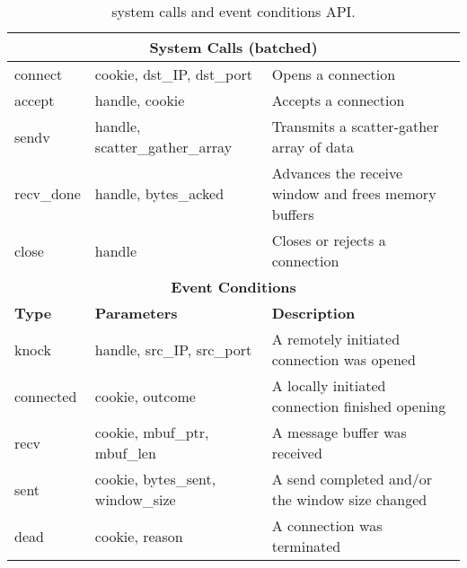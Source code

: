 \begin{table*}[t]
\centering
\begin{small}
\begin{tabular}{|l|l|l|}
\hline
\multicolumn{3}{|c|}{{\bf System Calls (batched)}} \\
\hline
connect &             cookie, dst\_IP, dst\_port		& Opens a connection\\
accept &              handle, cookie				& Accepts a connection\\
sendv &               handle, scatter\_gather\_array		& Transmits a scatter-gather array of data\\
recv\_done &          handle, bytes\_acked			& Advances the receive window and frees memory buffers\\
close &               handle					& Closes or rejects a connection\\
\hline  \hline
\multicolumn{3}{|c|}{{\bf Event Conditions}} \\
\hline
{\bf Type} &           {\bf Parameters}  &
{\bf Description}\\
knock  &               handle, src\_IP, src\_port		& A remotely initiated connection was opened \\
connected &            cookie, outcome				& A locally initiated connection finished opening \\
recv &                 cookie, mbuf\_ptr, mbuf\_len		& A message buffer was received \\
sent &                 cookie, bytes\_sent, window\_size	& A send completed and/or the window size changed \\
dead &                 cookie, reason				& A connection was terminated \\
\hline
\end{tabular}
\caption{\ix system calls and event conditions API. 
}
\label{tbl:api}
\end{small}
\end{table*}


